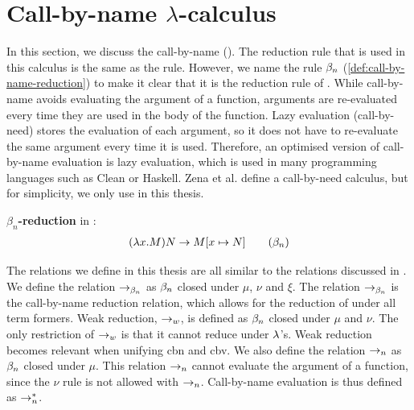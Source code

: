 
\section{\texorpdfstring{Call-by-name \boldmath$\lambda$-calculus}{Call-by-name Lambda Calculus}}
\label{sec:call-by-name}

In this section, we discuss the call-by-name \lc (\lan). 
The reduction rule that is used in this calculus is the same as the \br rule.
However, we name the rule $\beta_n$ (\cref{def:call-by-name-reduction}) to make it clear that it is the reduction rule of \lan.
While call-by-name avoids evaluating the argument of a function, arguments are re-evaluated every time they are used in the body of the function.
Lazy evaluation (call-by-need) stores the evaluation of each argument, so it does not have to re-evaluate the same argument every time it is used.
Therefore, an optimised version of call-by-name evaluation is lazy evaluation, which is used in many programming languages such as Clean or Haskell.
Zena et al. \cite{AriolaFelleisen1997} define a call-by-need calculus, but for simplicity, we only use \lan in this thesis. 

\begin{definition}
  \label{def:call-by-name-reduction}
  \textbf{\boldmath${\beta_n}$-reduction} in \lan:
  \begin{align*}
 (\lambda {x}.{M})N \to M [{x}\mapsto{N}] \quad \quad (\beta_n)
  \end{align*}
\end{definition}

The relations we define in this thesis are all similar to the relations discussed in \cite{espritosanto_et_al:LIPIcs:2019:10525}.
We define the relation $\to_{\beta_n}$ as $\beta_n$ closed under $\mu$, $\nu$ and $\xi$.
The relation $\to_{\beta_n}$ is the call-by-name reduction relation, which allows for the reduction of \lterms under all term formers.
Weak reduction, $\to_w$, is defined as $\beta_n$ closed under $\mu$ and $\nu$. The only restriction of $\to_w$ is that it cannot reduce \lterms under $\lambda$'s.
Weak reduction becomes relevant when unifying \textsf{cbn} and \textsf{cbv}.
We also define the relation $\to_n$ as $\beta_n$ closed under $\mu$.
This relation $\to_n$ cannot evaluate the argument of a function, since the $\nu$ rule is not allowed with $\to_n$.
Call-by-name evaluation is thus defined as $\to_n^*$. 


